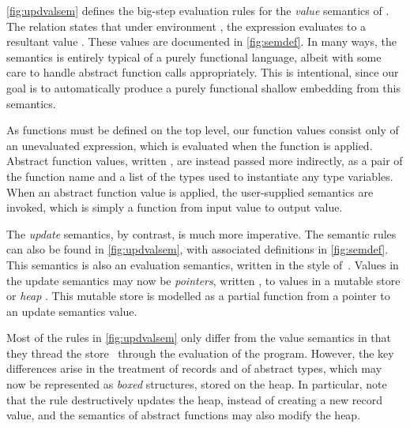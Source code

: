 \documentclass[9pt\ifFinal\else,preprint,nocopyrightspace\fi,\ifAlpha\else natbib,authoryear\fi]{sigplanconf}
\begin{document}
\autoref{fig:updvalsem} defines the big-step evaluation rules for the 
\emph{value} semantics of \CDSL. The relation
\mbox{} states that under
environment , the expression  evaluates to a resultant value
. These values are documented in \autoref{fig:semdef}. In many
ways, the semantics is entirely typical of a purely functional
language, albeit with some care to handle abstract function calls
appropriately. This is intentional, since our goal is to automatically
produce a purely functional shallow embedding from this semantics.

As functions must be defined on the top level, our function values
 consist only of an unevaluated expression, which is
evaluated when the function is applied. Abstract function values,
written , are instead passed more
indirectly, as a pair of the function name and a list of the types
used to instantiate any type variables.  When an abstract function
value  is applied, the user-supplied
semantics  are invoked, which is simply a function from
input value to output value.

The \emph{update} semantics, by contrast, is much more imperative. The
semantic rules can also be found in \autoref{fig:updvalsem}, with associated
definitions in
\autoref{fig:semdef}. This semantics is also an evaluation
semantics, written  in the style 
of~\citet{Pierce_02}. Values in the update semantics may now be 
\emph{pointers}, written , to values in a mutable store or \emph{heap} .  
This mutable store is modelled as a partial function from a pointer to 
an update semantics value. 


Most of the rules in \autoref{fig:updvalsem} only differ from the value
semantics in that they thread the store~ through the
evaluation of the program. However, the key differences arise in the
treatment of records and of abstract types, which may now be
represented as \emph{boxed} structures, stored on the heap. In
particular, note that the rule  destructively
updates the heap, instead of creating a new record value, and the
semantics of abstract functions  may also modify the
heap.
\end{document}
